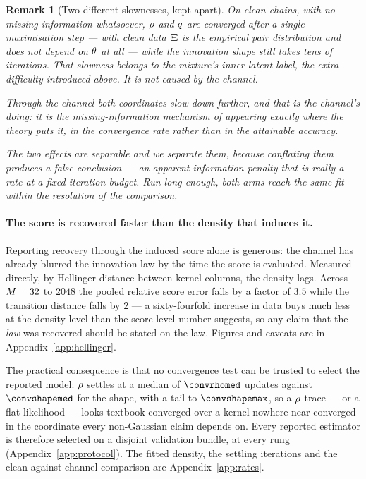 \documentclass{article}
\newtheorem{remark}{Remark}
\theoremstyle{definition}
\theoremstyle{plain}
\begin{document}
\begin{remark}[Two different slownesses, kept apart]
\label{rem:rates}
On \emph{clean} chains, with no missing information whatsoever, $\rho$ and $q$ are converged
after a single maximisation step --- with clean data $\mathbf{\Xi}$ is the empirical pair distribution and
does not depend on $\theta$ at all --- while the innovation shape still takes tens of iterations.
That slowness belongs to the mixture's inner latent label, the extra difficulty introduced above. It is not caused by the channel.

Through the channel both coordinates slow down further, and \emph{that} is the channel's doing:
it is the missing-information mechanism of \citet{dempster1977maximum} appearing exactly where the theory
puts it, in the convergence rate rather than in the attainable accuracy.

The two effects are separable and we separate them, because conflating them produces a false
conclusion --- an apparent \emph{information} penalty that is really a rate at a fixed iteration
budget. Run long enough, both arms reach the same fit within the resolution of the comparison.
\end{remark}

\paragraph{The score is recovered faster than the density that induces it.} Reporting recovery
through the induced score alone is generous: the channel has already blurred the innovation law by
the time the score is evaluated. Measured directly, by Hellinger distance between kernel columns,
the density lags. Across $M=32$ to $2048$ the pooled relative score error falls by a factor of $3.5$
while the transition distance falls by $2$ --- a sixty-fourfold increase in data buys much less at
the density level than the score-level number suggests, so any claim that the \emph{law} was
recovered should be stated on the law. Figures and caveats are in Appendix~\ref{app:hellinger}.

\noindent
The practical consequence is that no convergence test can be trusted to select the reported model:
$\rho$ settles at a median of $\convrhomed$ updates against $\convshapemed$ for the shape, with a
tail to $\convshapemax$, so a $\rho$-trace --- or a flat likelihood --- looks textbook-converged
over a kernel nowhere near converged in the coordinate every non-Gaussian claim depends on. Every reported estimator is therefore selected on
a disjoint validation bundle, at every rung (Appendix~\ref{app:protocol}). The fitted density,
the settling iterations and the clean-against-channel comparison are Appendix~\ref{app:rates}.
\end{document}
